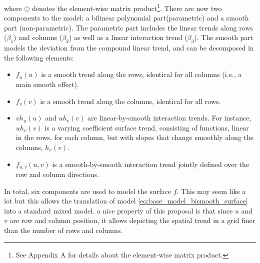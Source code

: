 where $\odot$ denotes the element-wise matrix product\footnote{See Appendix A for details about the element-wise matrix product.}. There are now two components to the model: a bilinear polynomial part(parametric) and a smooth part (non-parametric). The parametric part includes the linear trends along rows ($\beta_1$) and columns ($\beta_2$) as well as a linear interaction trend ($\beta_3$). The smooth part models the deviation from the compound linear trend, and can be decomposed in the following elements:
\begin{itemize}
\item $f _ { u } ( u )$  is a smooth trend along the rows, identical for all columns (i.e., a main smooth effect).
\item $f _ { v } ( v )$ is a smooth trend along the columns, identical for all rows.
\item $vh_u(u)$ and $uh_v(v)$ are linear-by-smooth interaction trends. For instance, $uh_v(v)$ is a varying coefficient surface trend, consisting of functions, linear in the rows, for each column, but with slopes that change smoothly along the columns, $h_v(v)$.
\item $f_{u,v}(u,v)$ is a smooth-by-smooth interaction trend jointly defined over the row and column directions.
\end{itemize}
In total, six components are used to model the surface $f$. This may seem like a lot but this allows the translation of model \ref{eq:base_model_bismooth_surface} into a standard mixed model. a nice property of this proposal is that since $u$ and $v$ are row and column position, it allows depicting the spatial trend in a grid finer than the number of rows and columns.

